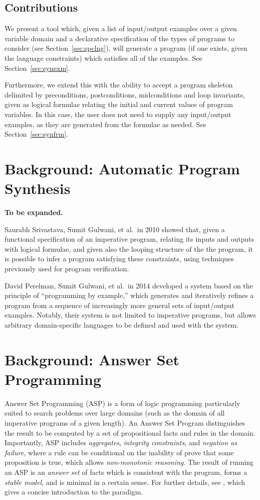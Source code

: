 \documentclass[a4paper,twoside,notitlepage]{article}
\begin{document}
\subsection{Contributions}
We present a tool which, given a list of input/output examples over a 
given variable domain and a declarative specification of the types of 
programs to consider (see Section~\ref{sec:spclng}), will generate a 
program (if one exists, given the language constraints) which satisfies 
all of the examples. See Section~\ref{sec:synexm}.

Furthermore, we extend this with the ability to accept a program skeleton 
delimited by preconditions, postconditions, midconditions and loop 
invariants, given as logical formulae relating the initial and current 
values of program variables. In this case, the user does not need to 
supply any input/output examples, as they are generated from the formulae 
as needed. See Section~\ref{sec:synfrm}.
\clearpage

\section{Background: Automatic Program Synthesis} \label{sec:bkgsyn}
\textbf{To be expanded.}

Saurabh Srivastava, Sumit Gulwani, et al.\ in 2010 showed\cite{popl10syn} 
that, given a functional specification of an imperative program, relating 
its inputs and outputs with logical formulae, and given also the looping 
structure of the the program, it is possible to infer a program satisfying 
these constraints, using techniques previously used for program 
verification.

David Perelman, Sumit Gulwani, et al.\ in 2014 developed a system\cite{tds} 
based on the principle of ``programming by example,'' which generates and 
iteratively refines a program from a sequence of increasingly more general 
sets of input/output examples. Notably, their system is not limited to 
imperative programs, but allows arbitrary domain-specific languages to be 
defined and used with the system.

\section{Background: Answer Set Programming} \label{sec:bkgasp}
Answer Set Programming (ASP) is a form of logic programming particularly 
suited to search problems over large domains (such as the domain of all 
imperative programs of a given length). An Answer Set Program distinguishes 
the result to be computed by a set of propositional facts and rules in the 
domain. Importantly, ASP includes \emph{aggregates}, \emph{integrity 
constraints}, and \emph{negation as failure}, where a rule can be conditional 
on the inability of prove that some proposition is true, which allows 
\emph{non-monotonic reasoning}. The result of running an ASP is an 
\emph{answer set} of facts which is consistent with the program, forms a 
\emph{stable model}, and is minimal in a certain sense. For further details, 
see \cite{glimpse}, which gives a concise introduction to the paradigm.
\end{document}
